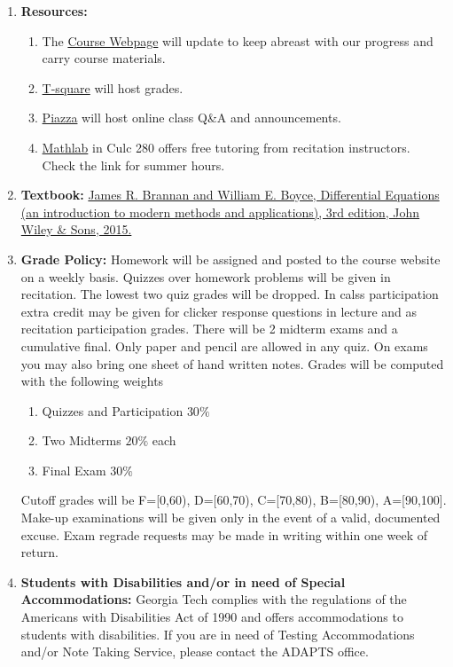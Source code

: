 \documentclass[12pt]{article}
\begin{document}
\begin{small}
\begin{enumerate}[]
\item \textbf{Resources:}
\begin{enumerate}[$\cdot$]
 \item  The \href{http://people.math.gatech.edu/~sscott42/teach/2552spring17/math2552.html}{Course Webpage} will update to keep abreast with our progress and carry course materials.
		\item \href{https://t-square.gatech.edu/portal}{T-square} will host grades. 
        \item \href{https://piazza.com/gatech/fall2015/math1551g/home}{Piazza} will host online class Q\&A and announcements.
		
		\item \href{https://www.math.gatech.edu/academics/undergraduate/tutors-and-labs}{Mathlab} in Culc 280 offers free tutoring from recitation instructors. Check the link for summer hours.
\end{enumerate}

\item \textbf{Textbook:}
\href{http://www.wiley.com/WileyCDA/WileyTitle/productCd-EHEP003244.html}{James R. Brannan and William E. Boyce, Differential Equations (an introduction to modern methods and applications), 3rd edition, John Wiley \& Sons, 2015.}

\item \textbf{Grade Policy:}
Homework will be assigned and posted to the course website on a weekly basis.
Quizzes over homework problems will be given in recitation. 
The lowest two quiz grades will be dropped.
In calss participation extra credit may be given for clicker response questions in lecture and as recitation participation grades.
There will be 2 midterm exams and a cumulative final.
Only paper and pencil are allowed in any quiz.
On exams you may also bring one sheet of hand written notes.
Grades will be computed with the following weights
\begin{enumerate}
\item Quizzes and Participation $30\%$
\item Two Midterms $20\%$ each
\item Final Exam $ 30\%$
\end{enumerate}
Cutoff grades will be F=[0,60), D=[60,70), C=[70,80), B=[80,90), A=[90,100].
Make-up examinations will be given only in the event of a valid, documented excuse.
Exam regrade requests may be made in writing within one week of return.

\item
\textbf{Students with Disabilities and/or in need of Special Accommodations:} Georgia Tech complies with the regulations of the Americans with Disabilities Act of 1990 and offers accommodations to students with disabilities. If you are in need of Testing Accommodations and/or Note Taking Service, please contact the ADAPTS office.


\end{enumerate}
\end{small}
\end{document}
